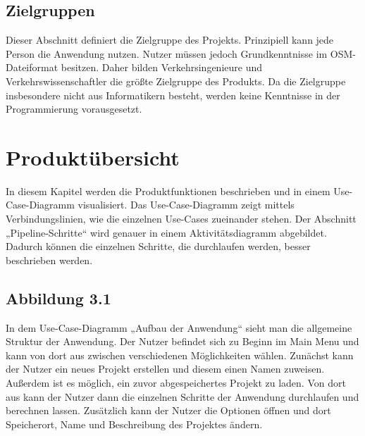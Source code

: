 \documentclass[parskip=full]{scrartcl} %
\begin{document}
\subsection{Zielgruppen}
Dieser Abschnitt definiert die Zielgruppe des Projekts. Prinzipiell kann jede Person die Anwendung nutzen. Nutzer müssen jedoch Grundkenntnisse im OSM-Dateiformat besitzen. Daher bilden Verkehrsingenieure und Verkehrswissenschaftler die größte Zielgruppe des Produkts. Da die Zielgruppe insbesondere nicht aus Informatikern besteht, werden keine Kenntnisse in der Programmierung vorausgesetzt.
\newpage

\section{Produktübersicht}
In diesem Kapitel werden die Produktfunktionen beschrieben und in einem Use-Case-Diagramm visualisiert. Das Use-Case-Diagramm zeigt mittels Verbindungslinien, wie die einzelnen Use-Cases zueinander stehen. Der Abschnitt „Pipeline-Schritte“ wird genauer in einem Aktivitätsdiagramm abgebildet. Dadurch können die einzelnen Schritte, die durchlaufen werden, besser beschrieben werden.

\subsection*{Abbildung 3.1}
In dem Use-Case-Diagramm „Aufbau der Anwendung“ sieht man die allgemeine Struktur der Anwendung. Der Nutzer befindet sich zu Beginn im Main Menu und kann von dort aus zwischen verschiedenen Möglichkeiten wählen.
Zunächst kann der Nutzer ein neues Projekt erstellen und diesem einen Namen zuweisen. Außerdem ist es möglich, ein zuvor abgespeichertes Projekt zu laden. Von dort aus kann der Nutzer dann die einzelnen Schritte der Anwendung durchlaufen und berechnen lassen. 
Zusätzlich kann der Nutzer die Optionen öffnen und dort Speicherort, Name und Beschreibung des Projektes ändern.
\end{document}
